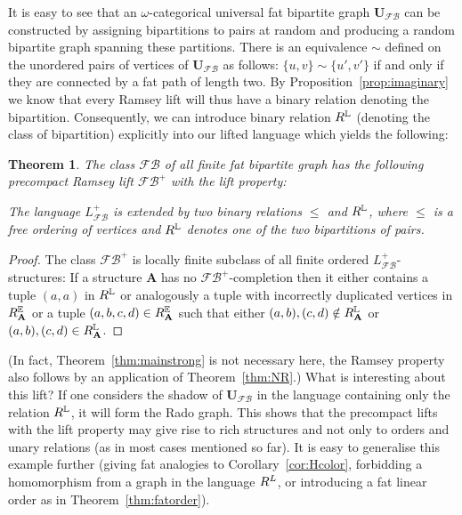 \documentclass{elsarticle}
\def\str#1{\mathbf {#1}}
\def\nbrel#1#2{R\ifstrempty{#1}{}{_{#1}}\ifstrempty{#2}{}{^{#2}}}
\def\rel#1#2{\nbrel{\ifstrempty{#1}{}{\str{#1}}}{#2}}
\theoremstyle{plain}
\newtheorem{theorem}{Theorem}[section]
\theoremstyle{definition}
\theoremstyle{remark}
\begin{document}
It is easy to see that an $\omega$-categorical universal fat bipartite graph $\str{U}_{\mathcal F\mathcal B}$ can be constructed
by assigning bipartitions to pairs at random and producing a random bipartite graph
spanning these partitions. There is an equivalence $\sim$ defined on the unordered pairs of vertices of $\str{U}_{\mathcal F\mathcal B}$ as follows:
$\{u,v\}\sim \{u',v'\}$ if and only if they are connected by a fat path of length two.  By Proposition~\ref{prop:imaginary}
we know that every Ramsey lift will thus have a binary relation denoting the bipartition.
Consequently, we can introduce binary relation $\rel{}{\mathbb{L}}$ (denoting the class of bipartition) explicitly into our lifted language
which yields the following:
\begin{theorem}
The class $\mathcal F\mathcal B$ of all finite fat bipartite graph has the following precompact Ramsey lift $\mathcal F\mathcal B^+$ with the lift property:

The language $L^+_\mathcal{FB}$ is extended by two binary relations $\leq$ and $\rel{}{\mathbb{L}}$, where $\leq$ is a free ordering of vertices and $\rel{}{\mathbb{L}}$ denotes one of the two bipartitions of pairs.
\end{theorem}
\begin{proof}
The class  $\mathcal F\mathcal B^+$ is locally finite subclass of all finite ordered
$L^+_\mathcal{FB}$-struc\-tures: If a structure $\str{A}$ has no $\mathcal F\mathcal B^+$-completion then it either contains a tuple $(a,a)$ in $\rel{}{\mathbb{L}}$ or analogously a tuple with incorrectly duplicated vertices in $\rel{A}{\mathbb E}$ or a tuple $(a,b,c,d)\in \rel{A}{\mathbb E}$ such that either $(a,b),(c,d)\notin \rel{A}{\mathbb{L}}$ or $(a,b),(c,d)\in \rel{A}{\mathbb{L}}$.
\end{proof}
(In fact, Theorem~\ref{thm:mainstrong} is not necessary here, the Ramsey property also follows by an application of Theorem~\ref{thm:NR}.)
What is interesting about this lift? If one considers the shadow of $\str{U}_{\mathcal F\mathcal B}$ in the language containing only the relation $\rel{}{\mathbb{L}}$,
it will form the Rado graph. 
This shows that the precompact lifts with the lift property may give rise to rich structures and not only to orders and unary relations (as in most cases mentioned so far).
It is easy to generalise this example further (giving fat analogies to Corollary~\ref{cor:Hcolor}, forbidding a homomorphism from a graph in the language $\rel{}{L}$, or introducing a fat linear order as in Theorem~\ref{thm:fatorder}).
\end{document}
